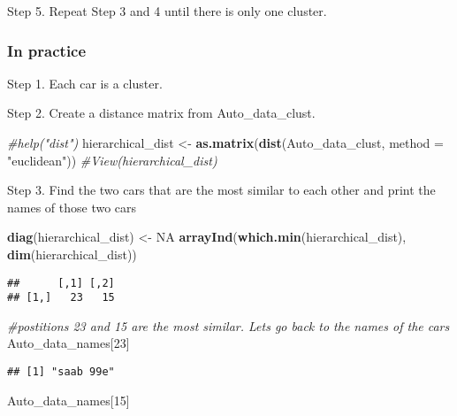 \documentclass[11pt,]{article}
\newenvironment{Shaded}{\begin{snugshade}}{\end{snugshade}}
\newcommand{\CommentTok}[1]{\textcolor[rgb]{0.56,0.35,0.01}{\textit{#1}}}
\newcommand{\DataTypeTok}[1]{\textcolor[rgb]{0.13,0.29,0.53}{#1}}
\newcommand{\DecValTok}[1]{\textcolor[rgb]{0.00,0.00,0.81}{#1}}
\newcommand{\KeywordTok}[1]{\textcolor[rgb]{0.13,0.29,0.53}{\textbf{#1}}}
\newcommand{\NormalTok}[1]{#1}
\newcommand{\OtherTok}[1]{\textcolor[rgb]{0.56,0.35,0.01}{#1}}
\newcommand{\StringTok}[1]{\textcolor[rgb]{0.31,0.60,0.02}{#1}}
\begin{document}
Step 5. Repeat Step 3 and 4 until there is only one cluster.

\hypertarget{in-practice}{%
\subsubsection{In practice}\label{in-practice}}

Step 1. Each car is a cluster.

Step 2. Create a distance matrix from Auto\_data\_clust.

\begin{Shaded}
\begin{Highlighting}[]
\CommentTok{#help("dist")}
\NormalTok{hierarchical_dist <-}\StringTok{ }\KeywordTok{as.matrix}\NormalTok{(}\KeywordTok{dist}\NormalTok{(Auto_data_clust, }\DataTypeTok{method =} \StringTok{"euclidean"}\NormalTok{))}
\CommentTok{#View(hierarchical_dist)}
\end{Highlighting}
\end{Shaded}

Step 3. Find the two cars that are the most similar to each other and
print the names of those two cars

\begin{Shaded}
\begin{Highlighting}[]
\KeywordTok{diag}\NormalTok{(hierarchical_dist) <-}\StringTok{ }\OtherTok{NA}
\KeywordTok{arrayInd}\NormalTok{(}\KeywordTok{which.min}\NormalTok{(hierarchical_dist), }\KeywordTok{dim}\NormalTok{(hierarchical_dist))}
\end{Highlighting}
\end{Shaded}

\begin{verbatim}
##      [,1] [,2]
## [1,]   23   15
\end{verbatim}

\begin{Shaded}
\begin{Highlighting}[]
\CommentTok{#postitions 23 and 15 are the most similar. Lets go back to the names of the cars}
\NormalTok{Auto_data_names[}\DecValTok{23}\NormalTok{]}
\end{Highlighting}
\end{Shaded}

\begin{verbatim}
## [1] "saab 99e"
\end{verbatim}

\begin{Shaded}
\begin{Highlighting}[]
\NormalTok{Auto_data_names[}\DecValTok{15}\NormalTok{]}
\end{Highlighting}
\end{Shaded}
\end{document}
